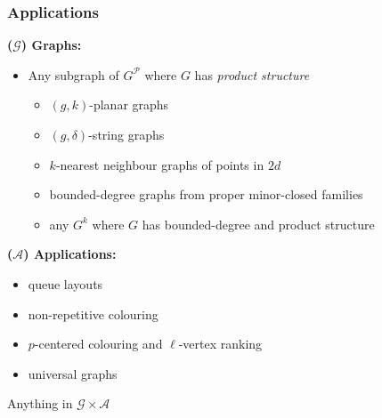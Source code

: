 \documentclass[xcolor=dvipsnames]{beamer}
\begin{document}
\begin{frame}
    \frametitle{Applications}

    \textbf{($\mathcal{G}$) Graphs:}
    \begin{itemize}
        \item Any subgraph of $G^\mathcal{P}$ where $G$ has \emph{product structure}
        \begin{itemize}
            \item $(g,k)$-planar graphs
            \item $(g,\delta)$-string graphs
            \item $k$-nearest neighbour graphs of points in $2d$
            \item bounded-degree graphs from proper minor-closed families
            \item any $G^k$ where $G$ has bounded-degree and product structure
        \end{itemize}
    \end{itemize}

    \textbf{($\mathcal{A}$) Applications:}
    \begin{itemize}
        \item queue layouts
        \item non-repetitive colouring
        \item $p$-centered colouring and $\ell$-vertex ranking
        \item universal graphs
    \end{itemize}

    Anything in $\mathcal{G}\times \mathcal{A}$
\end{frame}
\end{document}
